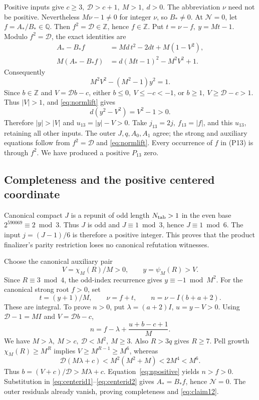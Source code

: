 \documentclass[11pt,a4paper]{article}
\theoremstyle{definition}
\newcommand{\Z}{\mathbb Z}
\begin{document}
Positive inputs give \(c\ge3,\ \mathcal D>c+1,\ M>1,\ d>0\).
The abbreviation \(\nu\) need not be positive.
Nevertheless \(M\nu-1\ne0\) for integer \(\nu\), so \(B_*\ne0\).
At \(\mathcal N=0\), let \(f=A_*/B_*\in\mathbb Q\).
Then \(f^2=\mathcal D\in\Z\), hence \(f\in\Z\).
Put \(t=\nu-f,\ y=Mt-1\). Modulo \(f^2=\mathcal D\),
the exact identities are
\begin{align}
 A_*-B_*f&=Md\,t^2-2dt+M(1-V^2),               \label{eq:centerid1}\\
 M(A_*-B_*f)&=d(Mt-1)^2-M^2V^2+1.             \label{eq:centerid2}
\end{align}
Consequently
\[
 M^2V^2-(M^2-1)y^2=1.                          \label{eq:normlift}
\]
Since \(b\in\Z\) and \(V=\mathcal D b-c\), either
\(b\le0,\ V\le-c<-1\), or \(b\ge1,\ V\ge\mathcal D-c>1\).
Thus \(|V|>1\), and \eqref{eq:normlift} gives
\[
 d(y^2-V^2)=V^2-1>0.
\]
Therefore \(|y|>|V|\) and \(u_{13}=|y|-V>0\).
Take \(j_{13}=2j,\ f_{13}=|f|\), and this \(u_{13}\), retaining
all other inputs. The outer \(J,q,A_0,A_1\) agree; the strong
and auxiliary equations follow from \(f^2=\mathcal D\)
and \eqref{eq:normlift}. Every occurrence of \(f\) in (P13)
is through \(f^2\). We have produced a positive \(P_{13}\) zero.

\subsection{Completeness and the positive centered coordinate}

Canonical compact \(J\) is a repunit of odd length
\(N_{\rm tab}>1\) in the even base \(2^{590069}\equiv2\bmod3\).
Thus \(J\) is odd and \(J\equiv1\bmod3\), hence \(J\equiv1\bmod6\).
The input \(j=(J-1)/6\) is therefore a positive integer.
This proves that the product finalizer's parity restriction
loses no canonical refutation witnesses.

Choose the canonical auxiliary pair
\[
 V=\chi_M(R)/M>0,\qquad y=\psi_M(R)>V.
\]
Since \(R\equiv3\bmod4\), the odd-index recurrence gives
\(y\equiv-1\bmod M^2\).
For the canonical strong root \(f>0\), set
\[
 t=(y+1)/M,\qquad \nu=f+t,\qquad
 n=\nu-I(b+a+2).
\]
These are integral. To prove \(n>0\), put
\(\lambda=(a+2)I\), \(u=y-V>0\).
Using \(\mathcal D-1=MI\) and \(V=\mathcal D b-c\),
\[
 n=f-\lambda+\frac{u+b-c+1}{M}.                 \label{eq:npositive}
\]
We have \(M>\lambda,\ M>c,\ \mathcal D<M^2,\ M\ge3\).
Also \(R>3q\) gives \(R\ge7\).
Pell growth \(\chi_M(R)\ge M^R\) implies
\(V\ge M^{R-1}\ge M^6\), whereas
\[
 \mathcal D(M\lambda+c)<M^2(M^2+M)<2M^4<M^6.
\]
Thus \(b=(V+c)/\mathcal D>M\lambda+c\).
Equation~\eqref{eq:npositive} yields \(n>f>0\).
Substitution in \eqref{eq:centerid1}--\eqref{eq:centerid2}
gives \(A_*=B_*f\), hence \(\mathcal N=0\).
The outer residuals already vanish, proving completeness
and \eqref{eq:claim12}.
\end{document}
